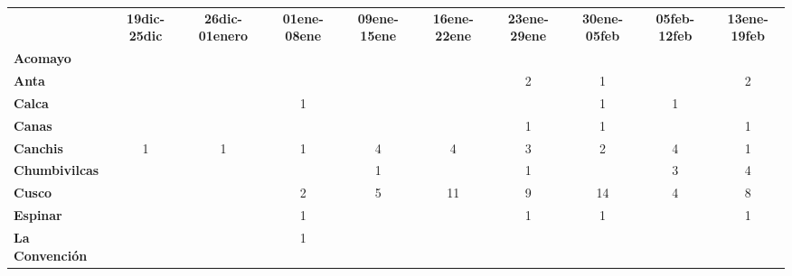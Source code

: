 \begin{tabular}{lccccccccc}
	&\textbf{19dic-25dic}
	&\textbf{26dic-01enero}						&\textbf{01ene-08ene}			&\textbf{09ene-15ene}						&\textbf{16ene-22ene}						&\textbf{23ene-29ene}						&\textbf{30ene-05feb}
	&\textbf{05feb-12feb}						&\textbf{13ene-19feb}\\
	\textbf{Acomayo}                        	
	&\cellcolor[HTML]{FCC46C}  			        &\cellcolor[HTML]{FCC46C}          			&\cellcolor[HTML]{FCC46C} 					&\cellcolor[HTML]{FCC46C} 	    			&\cellcolor[HTML]{FCC46C}				    &\cellcolor[HTML]{FCC46C}
	&\cellcolor[HTML]{FCC46C}					&\cellcolor[HTML]{FCC46C}
	&\cellcolor[HTML]{FCC46C}\\
	\textbf{Anta}                                                          					
	&\cellcolor[HTML]{FCC46C}					&\cellcolor[HTML]{FCC46C} 
	&\cellcolor[HTML]{FCC46C}					&\cellcolor[HTML]{FCC46C}
	&\cellcolor[HTML]{FCC46C}					&2 				
	&1
	&\cellcolor[HTML]{FCC46C}					&2\\
	\textbf{Calca}      				       								            
	&\cellcolor[HTML]{FCC46C}					&\cellcolor[HTML]{FCC46C} 
	&1											&\cellcolor[HTML]{FCC46C}	&\cellcolor[HTML]{FCC46C}					&\cellcolor[HTML]{FCC46C}
	&1 											&1	&\cellcolor[HTML]{FCC46C}\\                										
	\textbf{Canas}                              
	&\cellcolor[HTML]{FCC46C} 					&\cellcolor[HTML]{FCC46C} 		&\cellcolor[HTML]{FCC46C}					&\cellcolor[HTML]{FCC46C} 		
	&\cellcolor[HTML]{FCC46C}					&1
	&1											&\cellcolor[HTML]{FCC46C}
	&1\\
	\textbf{Canchis}                             		
	&1											&1
	&1											&4
	&4											&3
	&2											&4
	&1\\
	\textbf{Chumbivilcas}                      			
	&\cellcolor[HTML]{FCC46C}					&\cellcolor[HTML]{FCC46C}
	&\cellcolor[HTML]{FCC46C}					&1
	&\cellcolor[HTML]{FCC46C} 					&1
	&\cellcolor[HTML]{FCC46C}					&3
	&4\\
	\textbf{Cusco}                             												&\cellcolor[HTML]{FCC46C}											
	&\cellcolor[HTML]{FCC46C}					
	&2											&5
	&11											&9 	
	&14 										&4
	&8\\
	\textbf{Espinar}       					                 						   	 	&\cellcolor[HTML]{FCC46C}									
	&\cellcolor[HTML]{FCC46C}				    &1
	&\cellcolor[HTML]{FCC46C} 					&\cellcolor[HTML]{FCC46C}
	&1											&1
	&\cellcolor[HTML]{FCC46C}					&1\\
	\textbf{La Convención}                      		
	&\cellcolor[HTML]{FCC46C}  					&\cellcolor[HTML]{FCC46C} 		            &1 					

\end{tabular}
